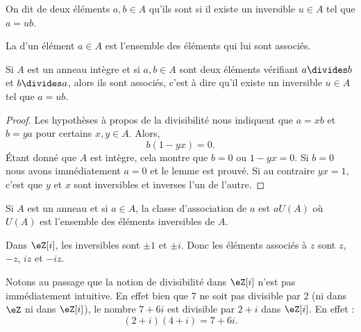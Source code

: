 \begin{definition}\label{DefrXUixs}
	On dit de deux éléments \( a,b\in A\) qu'ils sont  si il existe un inversible \( u\in A\) tel que \( a=ub\).

	La  d'un élément \( a \in A \) est l'ensemble des éléments qui lui sont associés.
\end{definition}

\begin{lemma}\label{LemRmVTRq}
	Si \( A\) est un anneau intègre et si \( a,b\in A\) sont deux éléments vérifiant \( a\divides b\) et \( b\divides a\), alors ils sont associés, c'est à dire qu'il existe un inversible \( u\in A\) tel que \( a=ub\).
\end{lemma}

\begin{proof}
	Les hypothèses à propos de la divisibilité nous indiquent que \( a=xb\) et \( b=ya\) pour certains \( x,y\in A\). Alors,
	\begin{equation}
		b(1-yx)=0.
	\end{equation}
	Étant donné que \( A\) est intègre, cela montre que \( b=0\) ou \( 1-yx=0\). Si \( b=0\) nous avons immédiatement \( a=0\) et le lemme est prouvé. Si au contraire \( yx=1\), c'est que \( y\) et \( x\) sont inversibles et inverses l'un de l'autre.
\end{proof}

\begin{lemma}       \label{LEMooJBOXooYkMRrz}
	Si \( A\) est un anneau et si \( a\in A\), la classe d'association de \( a\) est \( aU(A)\) où \( U(A)\) est l'ensemble des éléments inversibles de \( A\).
\end{lemma}

\begin{example}
	Dans \( \eZ[i]\), les inversibles sont \( \pm 1\) et \( \pm i\). Donc les éléments associés à \( z\) sont \( z\), \( -z\), \( iz\) et \( -iz\).

	Notons au passage que la notion de divisibilité dans \( \eZ[i]\) n'est pas immédiatement intuitive. En effet bien que \( 7\) ne soit pas divisible par \( 2\) (ni dans \( \eZ\) ni dans \( \eZ[i]\)), le nombre \( 7+6i\) est divisible par \( 2+i\) dans \( \eZ[i]\). En effet :
	\begin{equation}
		(2+i)(4+i)=7+6i.
	\end{equation}
\end{example}

